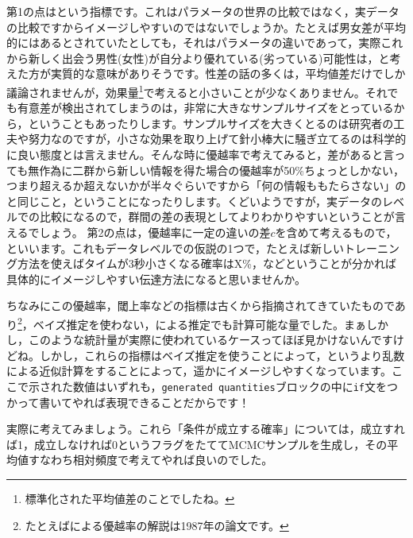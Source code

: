 \documentclass{ltjsbook}
\begin{document}
第1の点はという指標です。これはパラメータの世界の比較ではなく，実データの比較ですからイメージしやすいのではないでしょうか。たとえば男女差が平均的にはあるとされていたとしても，それはパラメータの違いであって，実際これから新しく出会う男性(女性)が自分より優れている(劣っている)可能性は，と考えた方が実質的な意味がありそうです。性差の話の多くは，平均値差だけでしか議論されませんが，効果量\footnote{標準化された平均値差のことでしたね。}で考えると小さいことが少なくありません。それでも有意差が検出されてしまうのは，非常に大きなサンプルサイズをとっているから，ということもあったりします。サンプルサイズを大きくとるのは研究者の工夫や努力なのですが，小さな効果を取り上げて針小棒大に騒ぎ立てるのは科学的に良い態度とは言えません。そんな時に優越率で考えてみると，差があると言っても無作為に二群から新しい情報を得た場合の優越率が50\%ちょっとしかない，つまり超えるか超えないかが半々ぐらいですから「何の情報ももたらさない」のと同じこと，ということになったりします。くどいようですが，実データのレベルでの比較になるので，群間の差の表現としてよりわかりやすいということが言えるでしょう。
第2の点は，優越率に一定の違いの差$c$を含めて考えるもので，といいます。これもデータレベルでの仮説の1つで，たとえば新しいトレーニング方法を使えばタイムが3秒小さくなる確率はX\%，などということが分かれば具体的にイメージしやすい伝達方法になると思いませんか。

ちなみにこの優越率，閾上率などの指標は古くから指摘されてきていたものであり\footnote{たとえば\citet{Haebara1987}による優越率の解説は1987年の論文です。}，ベイズ推定を使わない，による推定でも計算可能な量でした。まぁしかし，このような統計量が実際に使われているケースってほぼ見かけないんですけどね。しかし，これらの指標はベイズ推定を使うことによって，というより乱数による近似計算をすることによって，遥かにイメージしやすくなっています。ここで示された数値はいずれも，\verb|generated quantities|ブロックの中に\verb|if|文をつかって書いてやれば表現できることだからです！

実際に考えてみましょう。これら「条件が成立する確率」については，成立すれば1，成立しなければ0というフラグをたててMCMCサンプルを生成し，その平均値すなわち相対頻度で考えてやれば良いのでした。
\end{document}
